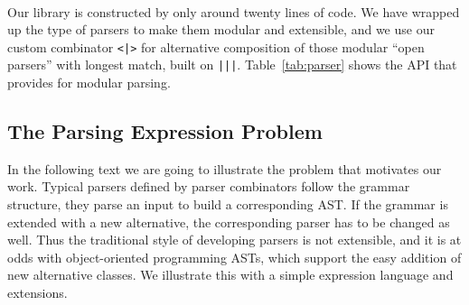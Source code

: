 \paragraph{\name} Our library is constructed by only around twenty lines of code. We have wrapped up the type of parsers
to make them modular and extensible, and we use our custom combinator \lstinline{<|>} for alternative composition of those
modular ``open parsers'' with longest match, built on \lstinline{|||}. Table~\ref{tab:parser} shows the API that \name provides for modular parsing.

\subsection{The Parsing Expression Problem}\label{subsec:overview-problem}


In the following text we are going to illustrate the problem that motivates our work.
Typical parsers defined by parser combinators follow the grammar
structure, they parse an input to build a corresponding AST. If the grammar is extended
with a new alternative, the corresponding parser has to be changed as
well. Thus the traditional style of developing parsers is not
extensible, and it is at odds with object-oriented programming ASTs,
which support the easy addition of new alternative classes. We
illustrate this with a simple expression language and extensions.

